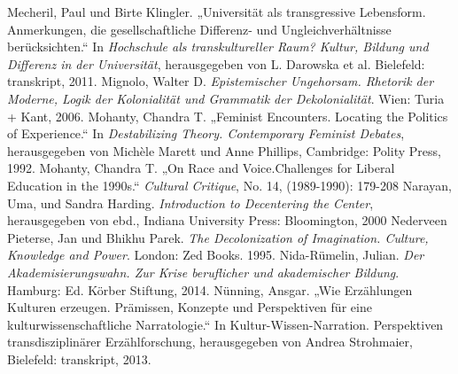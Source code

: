 \documentclass[11pt]{article}
\begin{document}
\begin{thebibliography}{100}
 Mecheril, Paul und  Birte Klingler. „Universität als
transgressive Lebensform. Anmerkungen, die gesellschaftliche Differenz- und
Ungleichverhältnisse berücksichten.“ In \emph{Hochschule als transkultureller
Raum? Kultur, Bildung und Differenz in der Universität}, herausgegeben von L. Darowska et al. Bielefeld: transkript, 2011. 
 Mignolo, Walter D. \emph{Epistemischer Ungehorsam. Rhetorik
der Moderne, Logik der Kolonialität und Grammatik der Dekolonialität}. Wien: Turia + Kant, 2006.
 Mohanty, Chandra T. „Feminist Encounters. Locating the
Politics of Experience.“ In \emph{Destabilizing
Theory. Contemporary Feminist Debates}, herausgegeben von Michèle Marett und Anne Phillips, Cambridge: Polity Press, 1992. 
 Mohanty, Chandra T. „On Race and Voice.Challenges for Liberal
Education in the 1990s.“ \emph{Cultural Critique}, No. 14, (1989-1990): 179-208
 Narayan, Uma, und Sandra  Harding. \emph{Introduction to
Decentering the Center}, herausgegeben von ebd., Indiana University Press: Bloomington, 2000
 Nederveen Pieterse, Jan und Bhikhu Parek. \emph{The Decolonization of Imagination. Culture,
Knowledge and Power}. London:  Zed Books. 1995.
 Nida-Rümelin, Julian. \emph{Der Akademisierungswahn. Zur Krise beruflicher und akademischer Bildung}. Hamburg: Ed. Körber Stiftung, 2014.
 Nünning, Ansgar. „Wie Erzählungen Kulturen erzeugen. Prämissen, Konzepte und Perspektiven für
eine kulturwissenschaftliche Narratologie.“ In Kultur-Wissen-Narration. Perspektiven transdisziplinärer Erzählforschung, herausgegeben von Andrea Strohmaier,  Bielefeld: transkript, 2013.
\end{thebibliography}
\end{document}
